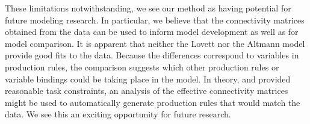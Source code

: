 \documentclass[10pt,letterpaper]{article}
\begin{document}
These limitations notwithstanding, we see our method as having potential for future modeling research. In particular, we believe that the connectivity matrices obtained from the data can be used to inform model development as well as for model comparison. It is apparent that neither the Lovett nor the Altmann model provide good fits to the data. Because the differences correspond to variables in production rules, the comparison suggests which other production rules or variable bindings could be taking place in the model. In theory, and provided reasonable task constraints, an analysis of the effective connectivity matrices might be used to automatically generate production rules that would match the data. We see this an exciting opportunity for future research. 









\setlength{\bibleftmargin}{.125in}
\setlength{\bibindent}{-\bibleftmargin}

\end{document}
